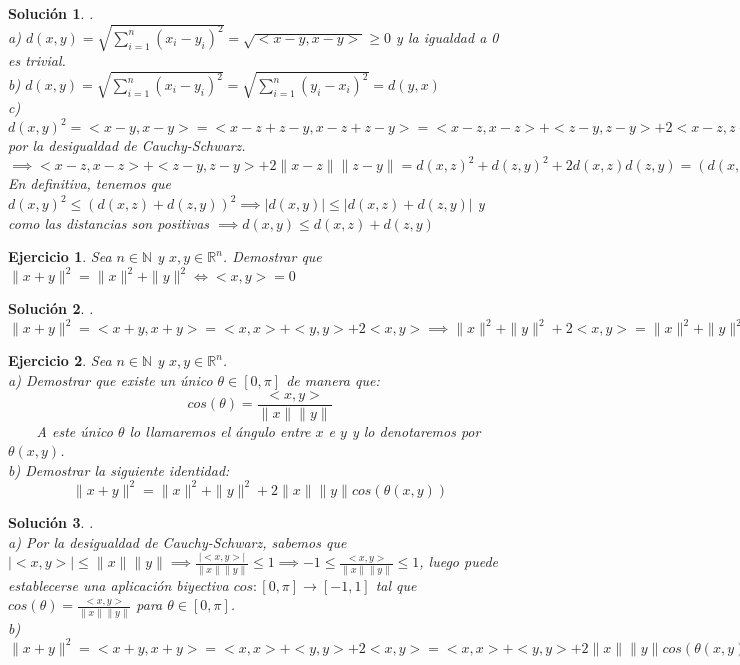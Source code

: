 \documentclass[11pt, a4paper]{article}
\newif\IfInSansMode
\newcommand{\R}{\mathbb{R}} \newcommand{\N}{\mathbb{N}}
\theoremstyle{theorem-style}
\theoremstyle{definition-style}
\newtheorem{ejer}{Ejercicio}[section]
\theoremstyle{remark-style}
\newtheorem*{sol}{Solución}
\theoremstyle{example-style}
\begin{document}
\begin{sol}.
\\ a) $ d(x,y) = \displaystyle{\sqrt{\sum_{i=1}^{n}(x_i-y_i)^2}} = \sqrt{<x-y,x-y>} \ge 0$ y la igualdad a 0 es trivial. \\
b) $ d(x,y) = \displaystyle{\sqrt{\sum_{i=1}^{n}(x_i-y_i)^2}} = \displaystyle{\sqrt{\sum_{i=1}^{n}(y_i-x_i)^2}} = d(y,x)$ \\
c) $ d(x,y)^2 = <x-y,x-y> = <x-z+z-y,x-z+z-y> = <x-z,x-z> + <z-y,z-y> + 2<x-z,z-y> \ \le \ <x-z,x-z> + <z-y,z-y> + 2\|x-z\| \|z-y\|$ por la desigualdad de Cauchy-Schwarz. $ \implies <x-z,x-z> + <z-y,z-y> + 2\|x-z\| \|z-y\| = d(x,z)^2+d(z,y)^2+2d(x,z)d(z,y) = (d(x,z)+d(z,y))^2.$ En definitiva, tenemos que $ d(x,y)^2 \le (d(x,z)+d(z,y))^2 \implies |d(x,y)| \le |d(x,z)+d(z,y)|$ y como las distancias son positivas $ \implies d(x,y) \le d(x,z)+d(z,y)$
\end{sol}

\begin{ejer}
Sea $n \in \N$ y $x,y \in \R^n$. Demostrar que $ \|x+y\|^2 = \|x\|^2+\|y\|^2 \Leftrightarrow <x,y> = 0$
\end{ejer}

\begin{sol}.
\\ $ \|x+y\|^2 = <x+y,x+y> = <x,x> + <y,y> + 2<x,y> \implies \|x\|^2+\|y\|^2 + 2<x,y> = \|x\|^2+\|y\|^2 \Leftrightarrow 2<x,y> = 0 \Leftrightarrow <x,y> = 0$
\end{sol}

\begin{ejer}
Sea $n \in \N$ y $x,y \in \R^n$. \\
a) Demostrar que existe un único $ \theta \in [0, \pi]$ de manera que: $$ cos(\theta) = \frac{<x,y>}{\|x\|\|y\|}$$ \ \ \ \ A este único $\theta$ lo llamaremos el ángulo entre $x$ e $y$ y lo denotaremos por $\theta(x, y)$. \\
b) Demostrar la siguiente identidad: $$ \|x+y\|^2 = \|x\|^2+\|y\|^2 + 2 \|x\|\|y\|cos(\theta(x,y))$$
\end{ejer}

\begin{sol}.
\\ a) Por la desigualdad de Cauchy-Schwarz, sabemos que $ |<x,y>| \le \|x\|\|y\| \implies \frac{|<x,y>|}{\|x\|\|y\|} \le 1 \implies -1 \le \frac{<x,y>}{\|x\|\|y\|} \le 1$, luego puede establecerse una aplicación biyectiva $ cos: [0,\pi] \rightarrow [-1,1]$ tal que $cos(\theta) = \frac{<x,y>}{\|x\|\|y\|}$ para $ \theta \in [0,\pi]$. \\
b) $ \|x+y\|^2 = <x+y,x+y> = <x,x> + <y,y> + 2<x,y> = <x,x> + <y,y> + 2\|x\|\|y\|cos(\theta(x,y))$ \\
\end{sol}
\end{document}
